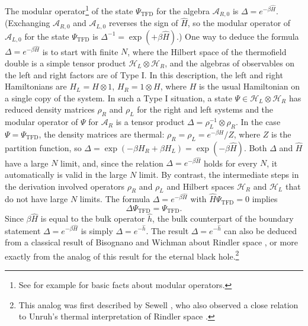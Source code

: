 \documentclass[11pt,a4paper]{article}
\def\be{\begin{equation}}
\def\ee{\end{equation}}
\def\h{\widehat}
\def\A{{\mathcal A}}
\def\h{\widehat}
\def\H{{\mathcal H}}
\def\TFD{{\mathrm{TFD}}}
\begin{document}
The modular operator\footnote{See for example \cite{OlderLectures} for basic facts about modular operators.} of the state $\Psi_\TFD$ for the algebra $\A_{R,0}$ is $\Delta=e^{-\beta\h H}$.   (Exchanging $\A_{R,0}$ and $\A_{L,0}$ reverses the sign of $\h H$, so the
modular operator of $\A_{L ,0}$ for the state $\Psi_\TFD$ is $\Delta^{-1}=\exp(+\beta\h H)$.)  
 One way to deduce the formula $\Delta=e^{-\beta\h H}$ is to start with finite $N$, where  the Hilbert space
 of the thermofield double is a simple tensor product $\H_L\otimes \H_R$, and the 
algebras of observables on the left and right factors
are of Type I.   In this description, the left and right Hamiltonians are $H_L=H\otimes 1$, $H_R=1\otimes H$, where $H$ is the usual Hamiltonian on a single
copy of the system.   In such a Type I situation, a state $\Psi\in \H_L\otimes \H_R$ has reduced density matrices $\rho_R$ and $\rho_L$ for the right and left systems
and the modular operator of $\Psi$ for $\A_R$ is a tensor product $\Delta=\rho_L^{-1}\otimes \rho_R$.    In the case $\Psi=\Psi_\TFD$, the density matrices are thermal:
$\rho_R=\rho_L=e^{-\beta H}/Z$, where $Z$ is the partition function, so $\Delta=\exp(-\beta H_R+\beta H_L)=\exp(-\beta \h H)$.   Both $\Delta $ and $\h H$ have a large $N$
limit, and,  since  the relation  $\Delta=e^{-\beta \h H}$ holds for every $N$, it automatically is valid in the large $N$ limit.   By contrast, the intermediate steps in the derivation involved operators  $\rho_R $
and $\rho_L$ and Hilbert spaces $\H_R$ and $\H_L$ that do not have large $N$ limits.  
 The formula $\Delta=e^{-\beta \h H}$ with $\h H\Psi_\TFD=0$ implies
\be\label{ingo} \Delta \Psi_\TFD=\Psi_\TFD.\ee
Since $\beta \h H$ is equal to the bulk operator $\h h$, the bulk counterpart of the boundary statement $\Delta=e^{-\beta \h H}$ is simply $\Delta = e^{-\h h}$.  
The result $\Delta = e^{-\h h}$ can also be deduced from a classical result of Bisognano and Wichman about Rindler space \cite{BW}, 
or more exactly from the analog of this result for the eternal black hole.\footnote{This analog was first described by Sewell \cite{Sewell},
who also observed a close relation to 
Unruh's thermal interpretation of Rindler space \cite{Unruh}.}
\end{document}
